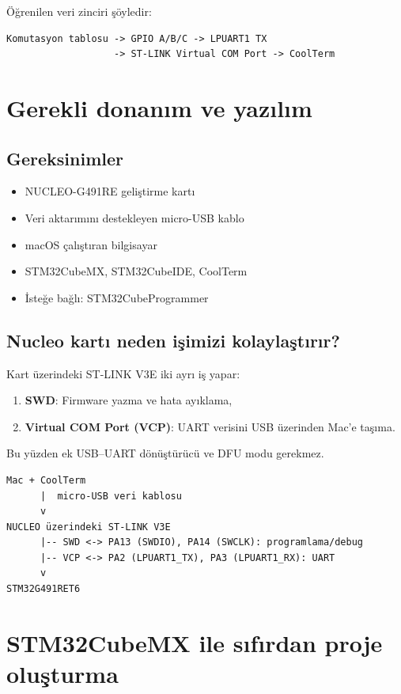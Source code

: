 \documentclass[11pt,a4paper]{article}
\begin{document}
Öğrenilen veri zinciri şöyledir:

\begin{lstlisting}
Komutasyon tablosu -> GPIO A/B/C -> LPUART1 TX
                   -> ST-LINK Virtual COM Port -> CoolTerm
\end{lstlisting}

\section{Gerekli donanım ve yazılım}

\subsection{Gereksinimler}
\begin{itemize}
  \item NUCLEO-G491RE geliştirme kartı
  \item Veri aktarımını destekleyen micro-USB kablo
  \item macOS çalıştıran bilgisayar
  \item STM32CubeMX, STM32CubeIDE, CoolTerm
  \item İsteğe bağlı: STM32CubeProgrammer
\end{itemize}

\subsection{Nucleo kartı neden işimizi kolaylaştırır?}

Kart üzerindeki ST-LINK V3E iki ayrı iş yapar:
\begin{enumerate}
  \item \textbf{SWD}: Firmware yazma ve hata ayıklama,
  \item \textbf{Virtual COM Port (VCP)}: UART verisini USB üzerinden Mac'e taşıma.
\end{enumerate}

Bu yüzden ek USB--UART dönüştürücü ve DFU modu gerekmez.

\begin{lstlisting}
Mac + CoolTerm
      |  micro-USB veri kablosu
      v
NUCLEO üzerindeki ST-LINK V3E
      |-- SWD <-> PA13 (SWDIO), PA14 (SWCLK): programlama/debug
      |-- VCP <-> PA2 (LPUART1_TX), PA3 (LPUART1_RX): UART
      v
STM32G491RET6
\end{lstlisting}

\section{STM32CubeMX ile sıfırdan proje oluşturma}
\end{document}
